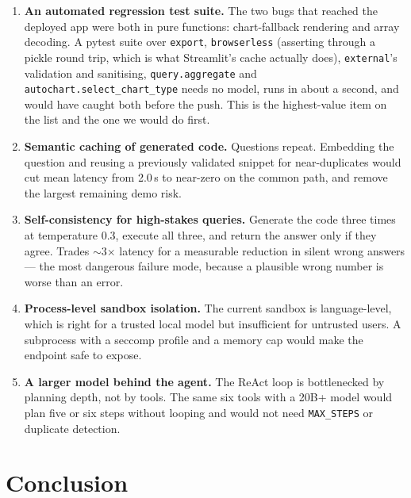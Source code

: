 \documentclass[11pt,a4paper]{article}
\begin{document}
\begin{enumerate}[leftmargin=*]
\item \textbf{An automated regression test suite.} The two bugs that reached the
      deployed app were both in pure functions: chart-fallback rendering and array
      decoding. A pytest suite over \texttt{export}, \texttt{browserless} (asserting
      through a pickle round trip, which is what Streamlit's cache actually does),
      \texttt{external}'s validation and sanitising, \texttt{query.aggregate} and
      \texttt{autochart.select\_chart\_type} needs no model, runs in about a second, and
      would have caught both before the push. This is the highest-value item on the list
      and the one we would do first.

\item \textbf{Semantic caching of generated code.} Questions repeat. Embedding the
      question and reusing a previously validated snippet for near-duplicates would cut
      mean latency from 2.0\,s to near-zero on the common path, and remove the largest
      remaining demo risk.

\item \textbf{Self-consistency for high-stakes queries.} Generate the code three times
      at temperature 0.3, execute all three, and return the answer only if they agree.
      Trades $\sim$3$\times$ latency for a measurable reduction in silent wrong answers
      --- the most dangerous failure mode, because a plausible wrong number is worse
      than an error.

\item \textbf{Process-level sandbox isolation.} The current sandbox is language-level,
      which is right for a trusted local model but insufficient for untrusted users. A
      subprocess with a seccomp profile and a memory cap would make the endpoint safe to
      expose.

\item \textbf{A larger model behind the agent.} The ReAct loop is bottlenecked by
      planning depth, not by tools. The same six tools with a 20B+ model would plan five
      or six steps without looping and would not need \texttt{MAX\_STEPS} or
      duplicate detection.
\end{enumerate}

\section{Conclusion}
\end{document}
